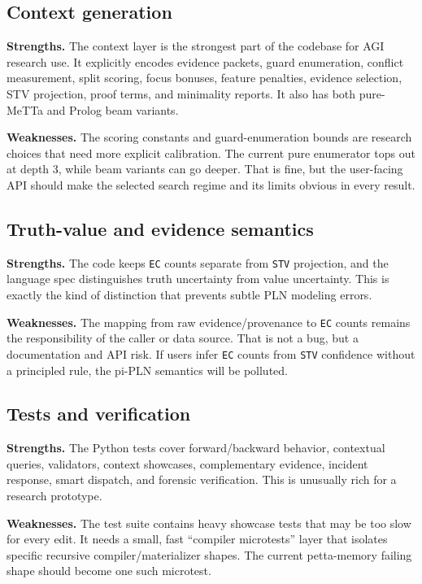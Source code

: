 \documentclass[11pt]{article}
\newcommand{\code}[1]{\texttt{#1}}
\begin{document}
\subsection{Context generation}

\textbf{Strengths.}  The context layer is the strongest part of the codebase for
AGI research use.  It explicitly encodes evidence packets, guard enumeration,
conflict measurement, split scoring, focus bonuses, feature penalties, evidence
selection, STV projection, proof terms, and minimality reports.  It also has both
pure-MeTTa and Prolog beam variants.

\textbf{Weaknesses.}  The scoring constants and guard-enumeration bounds are
research choices that need more explicit calibration.  The current pure
enumerator tops out at depth 3, while beam variants can go deeper.  That is fine,
but the user-facing API should make the selected search regime and its limits
obvious in every result.

\subsection{Truth-value and evidence semantics}

\textbf{Strengths.}  The code keeps \code{EC} counts separate from \code{STV}
projection, and the language spec distinguishes truth uncertainty from value
uncertainty.  This is exactly the kind of distinction that prevents subtle PLN
modeling errors.

\textbf{Weaknesses.}  The mapping from raw evidence/provenance to \code{EC}
counts remains the responsibility of the caller or data source.  That is not a
bug, but a documentation and API risk.  If users infer \code{EC} counts from
\code{STV} confidence without a principled rule, the pi-PLN semantics will be
polluted.

\subsection{Tests and verification}

\textbf{Strengths.}  The Python tests cover forward/backward behavior, contextual
queries, validators, context showcases, complementary evidence, incident
response, smart dispatch, and forensic verification.  This is unusually rich
for a research prototype.

\textbf{Weaknesses.}  The test suite contains heavy showcase tests that may be
too slow for every edit.  It needs a small, fast ``compiler microtests'' layer
that isolates specific recursive compiler/materializer shapes.  The current
petta-memory failing shape should become one such microtest.
\end{document}
